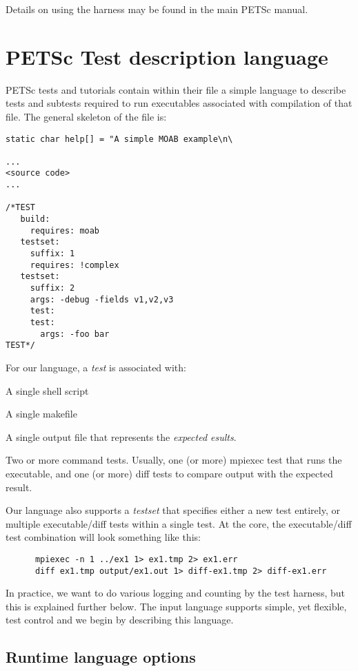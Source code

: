 Details on using the harness may be found in the main PETSc manual.

\section{PETSc Test description language%
  \label{petsc-test-description-language}%
}

PETSc tests and tutorials contain within their file a simple language to
describe tests and subtests required to run executables associated with
compilation of that file.  The general skeleton of the file is:
%
\begin{lstlisting}
static char help[] = "A simple MOAB example\n\

...
<source code>
...

/*TEST
   build:
     requires: moab
   testset:
     suffix: 1
     requires: !complex
   testset:
     suffix: 2
     args: -debug -fields v1,v2,v3 
     test:
     test:
       args: -foo bar
TEST*/
\end{lstlisting}

For our language, a \emph{test} is associated with:
\begin{tightitemize}
  \item A single shell script
  \item A single makefile 
  \item A single output file that represents the \emph{expected
       esults}.
  \item Two or more command tests.  Usually, one (or more) mpiexec
        test that runs the executable, and one (or more) diff tests to
        compare output with the expected result.
\end{tightitemize}
Our language also supports a \emph{testset} that specifies
either a new test entirely, or multiple executable/diff tests
within a single test.  At the core, the executable/diff test combination
will look something like this:
%
\begin{lstlisting}
      mpiexec -n 1 ../ex1 1> ex1.tmp 2> ex1.err
      diff ex1.tmp output/ex1.out 1> diff-ex1.tmp 2> diff-ex1.err
\end{lstlisting}

In practice, we want to do various logging and counting by the test
harness, but this is explained further below.  The input language
supports simple, yet flexible, test control and we begin by
describing this language.


\subsection{Runtime language options%
  \label{runtime-language-options}%
}

